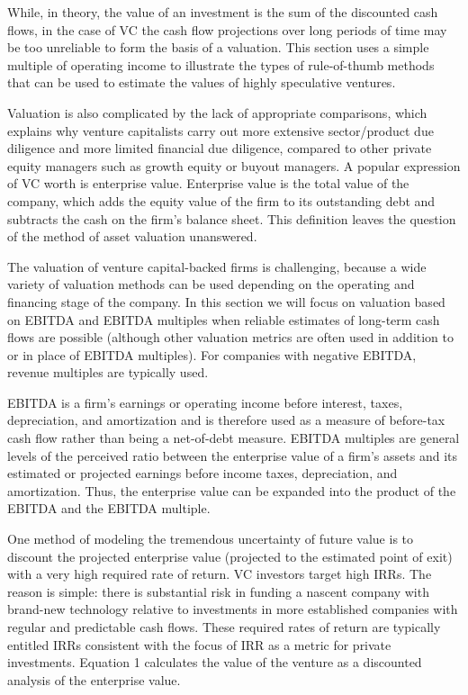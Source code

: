 \documentclass[11pt]{article}
\begin{document}
While, in theory, the value of an investment is the sum of the discounted cash flows, in the case of VC the cash flow projections over long periods of time may be too unreliable to form the basis of a valuation. This section uses a simple multiple of operating income to illustrate the types of rule-of-thumb methods that can be used to estimate the values of highly speculative ventures.

Valuation is also complicated by the lack of appropriate comparisons, which explains why venture capitalists carry out more extensive sector/product due diligence and more limited financial due diligence, compared to other private equity managers such as growth equity or buyout managers. A popular expression of VC worth is enterprise value. Enterprise value is the total value of the company, which adds the equity value of the firm to its outstanding debt and subtracts the cash on the firm's balance sheet. This definition leaves the question of the method of asset valuation unanswered.

The valuation of venture capital-backed firms is challenging, because a wide variety of valuation methods can be used depending on the operating and financing stage of the company. In this section we will focus on valuation based on EBITDA and EBITDA multiples when reliable estimates of long-term cash flows are possible (although other valuation metrics are often used in addition to or in place of EBITDA multiples). For companies with negative EBITDA, revenue multiples are typically used.

EBITDA is a firm's earnings or operating income before interest, taxes, depreciation, and amortization and is therefore used as a measure of before-tax cash flow rather than being a net-of-debt measure. EBITDA multiples are general levels of the perceived ratio between the enterprise value of a firm's assets and its estimated or projected earnings before income taxes, depreciation, and amortization. Thus, the enterprise value can be expanded into the product of the EBITDA and the EBITDA multiple.

One method of modeling the tremendous uncertainty of future value is to discount the projected enterprise value (projected to the estimated point of exit) with a very high required rate of return. VC investors target high IRRs. The reason is simple: there is substantial risk in funding a nascent company with brand-new technology relative to investments in more established companies with regular and predictable cash flows. These required rates of return are typically entitled IRRs consistent with the focus of IRR as a metric for private investments. Equation 1 calculates the value of the venture as a discounted analysis of the enterprise value.
\end{document}
